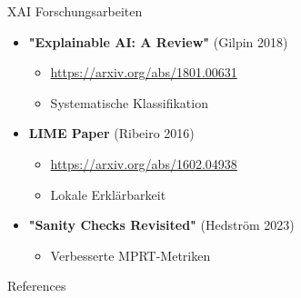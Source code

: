 \documentclass[aspectratio=1610, xcolor=dvipsnames, 9pt]{beamer}
\begin{document}
\begin{frame}{XAI Forschungsarbeiten}
  \begin{itemize}
    \item \textbf{"Explainable AI: A Review"} (Gilpin 2018)
    \begin{itemize}
      \item \url{https://arxiv.org/abs/1801.00631}
      \item Systematische Klassifikation
    \end{itemize}
    \item \textbf{LIME Paper} (Ribeiro 2016)
    \begin{itemize}
      \item \url{https://arxiv.org/abs/1602.04938}
      \item Lokale Erklärbarkeit
    \end{itemize}
    \item \textbf{"Sanity Checks Revisited"} (Hedström 2023)
    \begin{itemize}
      \item Verbesserte MPRT-Metriken
    \end{itemize}
  \end{itemize}
\end{frame}

\begin{frame}[allowframebreaks]{References}
  
  
\end{frame}
\end{document}
